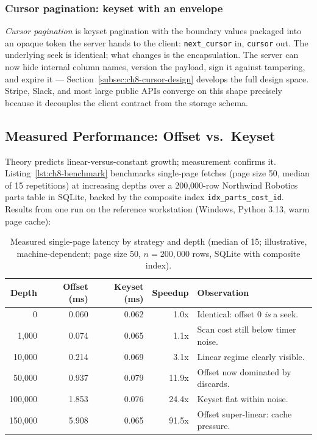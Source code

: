 \subsubsection{Cursor pagination: keyset with an envelope}

\emph{Cursor pagination} is keyset pagination with the boundary values
packaged into an opaque token the server hands to the client:
\texttt{next\_cursor} in, \texttt{cursor} out. The underlying seek is
identical; what changes is the encapsulation. The server can now hide
internal column names, version the payload, sign it against tampering, and
expire it --- Section~\ref{subsec:ch8-cursor-design} develops the full
design space. Stripe, Slack, and most large public APIs converge on this
shape precisely because it decouples the client contract from the storage
schema.

\subsection{Measured Performance: Offset vs.\ Keyset}
\label{subsec:ch8-benchmark}

Theory predicts linear-versus-constant growth; measurement confirms it.
Listing~\ref{lst:ch8-benchmark} benchmarks single-page fetches (page size
50, median of 15 repetitions) at increasing depths over a 200{,}000-row
Northwind Robotics parts table in SQLite, backed by the composite index
\texttt{idx\_parts\_cost\_id}. Results from one run on the reference
workstation (Windows, Python 3.13, warm page cache):

\begin{table}[h]
  \centering
  \small
  \begin{tabularx}{\textwidth}{r r r r X}
    \toprule
    \textbf{Depth} & \textbf{Offset (ms)} & \textbf{Keyset (ms)} &
    \textbf{Speedup} & \textbf{Observation} \\
    \midrule
    0       & 0.060 & 0.062 & 1.0x  & Identical: offset 0 \emph{is} a seek. \\
    1{,}000   & 0.074 & 0.065 & 1.1x  & Scan cost still below timer noise. \\
    10{,}000  & 0.214 & 0.069 & 3.1x  & Linear regime clearly visible. \\
    50{,}000  & 0.937 & 0.079 & 11.9x & Offset now dominated by discards. \\
    100{,}000 & 1.853 & 0.076 & 24.4x & Keyset flat within noise. \\
    150{,}000 & 5.908 & 0.065 & 91.5x & Offset super-linear: cache pressure. \\
    \bottomrule
  \end{tabularx}
  \caption{Measured single-page latency by strategy and depth
           (median of 15; illustrative, machine-dependent; page size 50,
           $n = 200{,}000$ rows, SQLite with composite index).}
  \label{tab:ch8-benchmark}
\end{table}

